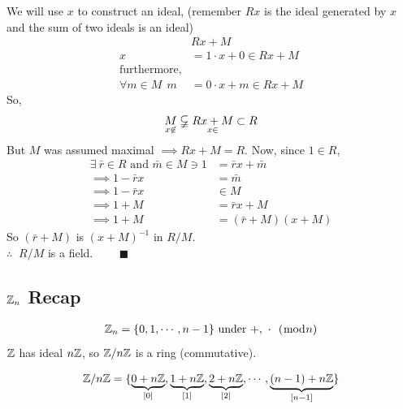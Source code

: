 \begin{theorem}
    We will use $x$ to construct an ideal, (remember $Rx$ is the ideal generated by $x$ and the sum
    of two ideals is an ideal)
    \begin{align}
        &Rx+M \nonumber \\
        x&= 1\cdot x + 0 \in Rx + M \nonumber\\
    \text{furthermore,}& \nonumber \\
        \forall m \in M \ \ m &= 0\cdot x + m \in Rx+M \nonumber
    \end{align}
    So,
    \begin{align}
        \underset{x\not\in}{M} \varsubsetneqq \underset{x\in}{Rx+M} \subset R \nonumber
    \end{align}
    But $M$ was assumed maximal $\implies Rx+M = R$. Now, since $1\in R$,
    \begin{align}
        \exists \ \bar{r} \in R \text{ and } \bar{m}\in M \ni 1&=\bar{r}x+\bar{m} \nonumber \\
        \implies 1-\bar{r}x &= \bar{m} \nonumber \\
        \implies 1-\bar{r}x &\in M \nonumber \\
        \implies 1+M &= \bar{r}x+M \nonumber \\
        \implies 1+M &= (\bar{r}+M)(x+M) \nonumber
    \end{align}
    So $(\bar{r}+M)$ is $(x+M)^{-1}$ in $R/M$. \\
    $\therefore$ $\ R/M$ is a field. \ \ \ \ $\blacksquare$
\end{theorem}
\newpage
\subsection{${\mathbb{Z}}_n$ Recap}
\begin{align}
    {\mathbb{Z}}_n = \{0,1,\cdots , n-1\} \text{ under  }  +,\ \cdot \ \ (\bmod n) \nonumber
\end{align}
${\mathbb{Z}}$ has ideal $n{\mathbb{Z}}$, so ${\mathbb{Z}}/n{\mathbb{Z}}$ is a ring (commutative).

\begin{align}
    {\mathbb{Z}}/n{\mathbb{Z}} = \{\underbrace{0+n{\mathbb{Z}}}_{[0]}, \underbrace{1+n{\mathbb{Z}}}_{[1]}, \underbrace{2+n{\mathbb{Z}}}_{[2]}, \cdots , \underbrace{(n-1)+n{\mathbb{Z}}}_{[n-1]}\} \nonumber
\end{align}

